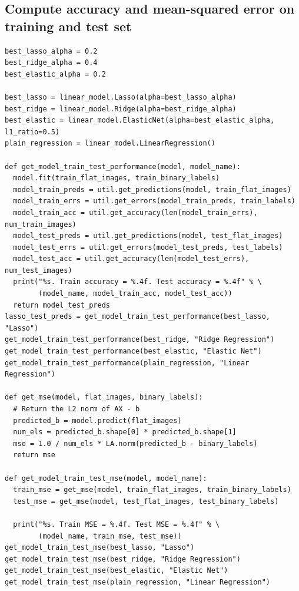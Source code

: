\documentclass[letterpaper, 10 pt, conference]{ieeeconf}  %
\begin{document}
\subsection*{Compute accuracy and mean-squared error on training and test set}
\begin{verbatim}
best_lasso_alpha = 0.2
best_ridge_alpha = 0.4
best_elastic_alpha = 0.2

best_lasso = linear_model.Lasso(alpha=best_lasso_alpha)
best_ridge = linear_model.Ridge(alpha=best_ridge_alpha)
best_elastic = linear_model.ElasticNet(alpha=best_elastic_alpha, l1_ratio=0.5)
plain_regression = linear_model.LinearRegression()

def get_model_train_test_performance(model, model_name):
  model.fit(train_flat_images, train_binary_labels)
  model_train_preds = util.get_predictions(model, train_flat_images)
  model_train_errs = util.get_errors(model_train_preds, train_labels)
  model_train_acc = util.get_accuracy(len(model_train_errs), num_train_images)
  model_test_preds = util.get_predictions(model, test_flat_images)
  model_test_errs = util.get_errors(model_test_preds, test_labels)
  model_test_acc = util.get_accuracy(len(model_test_errs), num_test_images)
  print("%s. Train accuracy = %.4f. Test accuracy = %.4f" % \
        (model_name, model_train_acc, model_test_acc))
  return model_test_preds
lasso_test_preds = get_model_train_test_performance(best_lasso, "Lasso")
get_model_train_test_performance(best_ridge, "Ridge Regression")
get_model_train_test_performance(best_elastic, "Elastic Net")
get_model_train_test_performance(plain_regression, "Linear Regression")

def get_mse(model, flat_images, binary_labels):
  # Return the L2 norm of AX - b
  predicted_b = model.predict(flat_images)
  num_els = predicted_b.shape[0] * predicted_b.shape[1]
  mse = 1.0 / num_els * LA.norm(predicted_b - binary_labels)
  return mse

def get_model_train_test_mse(model, model_name):
  train_mse = get_mse(model, train_flat_images, train_binary_labels)
  test_mse = get_mse(model, test_flat_images, test_binary_labels)
  
  print("%s. Train MSE = %.4f. Test MSE = %.4f" % \
        (model_name, train_mse, test_mse))
get_model_train_test_mse(best_lasso, "Lasso")
get_model_train_test_mse(best_ridge, "Ridge Regression")
get_model_train_test_mse(best_elastic, "Elastic Net")
get_model_train_test_mse(plain_regression, "Linear Regression")
\end{verbatim}
\end{document}
